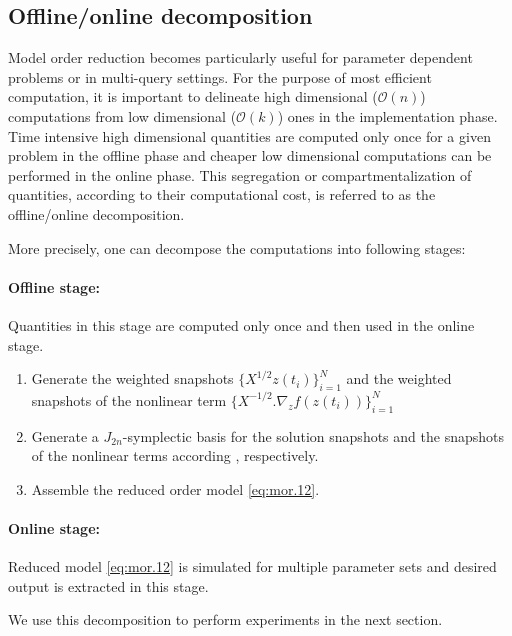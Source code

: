 \subsection{Offline/online decomposition} \label{sec:normmor.4}
Model order reduction becomes particularly useful for parameter dependent problems or in multi-query settings. For the purpose of most efficient computation, it is important to delineate high dimensional ($\mathcal{O}(n)$) computations from low dimensional ($\mathcal{O}(k)$) ones in the implementation phase. Time intensive high dimensional quantities are computed only once for a given problem in the offline phase and cheaper low dimensional computations can be performed in the online phase. This segregation or compartmentalization of quantities, according to their computational cost, is referred to as the offline/online decomposition.

More precisely, one can decompose the computations into following stages:
\paragraph{Offline stage:} Quantities in this stage are computed only once and then used in the online stage.
\begin{enumerate}
\item Generate the weighted snapshots $\{ X^{1/2} z(t_i) \}_{i=1}^N$ and the weighted snapshots of the nonlinear term $\{X^{-1/2}. \nabla_zf(z(t_i))\}_{i=1}^N$
\item Generate a $J_{2n}$-symplectic basis for the solution snapshots and the snapshots of the nonlinear terms according , respectively.
\item Assemble the reduced order model \cref{eq:mor.12}.
\end{enumerate}

\paragraph{Online stage:} Reduced model \cref{eq:mor.12} is simulated for multiple parameter sets and desired output is extracted in this stage.

We use this decomposition to perform experiments in the next section.
